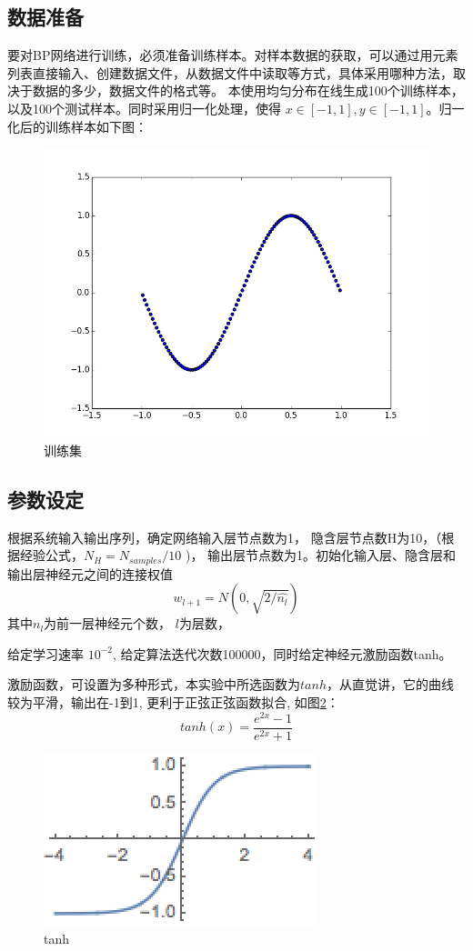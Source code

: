 \documentclass{article}
\begin{document}
\begin{CJK}{UTF8}{gkai}
\subsection{数据准备}
要对BP网络进行训练，必须准备训练样本。对样本数据的获取，可以通过用元素列表直接输入、创建数据文件，从数据文件中读取等方式，具体采用哪种方法，取决于数据的多少，数据文件的格式等。  本使用均匀分布在线生成100个训练样本，以及100个测试样本。同时采用归一化处理，使得 $x \in [-1, 1], y\in [-1, 1]$。归一化后的训练样本如下图：

\begin{figure}
	\centering
	\includegraphics[width=\linewidth]{../scatter}
	\caption{训练集}
	\label{fig:fig0}
\end{figure}
\subsection{参数设定}
根据系统输入输出序列，确定网络输入层节点数为1，
隐含层节点数H为10，（根据经验公式，$N_H = N_{samples}/10$ )，
输出层节点数为1。初始化输入层、隐含层和输出层神经元之间的连接权值\cite{he2015delving}
\begin{equation}
	w_{l+1} = N(0,\sqrt{2/\hat{n_l}})
\end{equation}
其中$n_l$为前一层神经元个数， $l$为层数，

给定学习速率 $10^{-2}$, 给定算法迭代次数100000，同时给定神经元激励函数tanh。

激励函数，可设置为多种形式，本实验中所选函数为$tanh$，从直觉讲，它的曲线较为平滑，输出在-1到1, 更利于正弦正弦函数拟合, 如图\ref{fig:tanh}：
\begin{equation}
	tanh(x) = \frac{e^{2x}-1}{e^{2x}+1}
\end{equation}
\begin{figure}
	\centering
	\includegraphics[width=.3\linewidth]{../tanh}
	\caption{tanh}
	\label{fig:tanh}
\end{figure}


\end{CJK}
\end{document}
